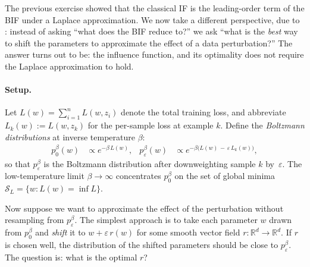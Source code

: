 \documentclass[11pt]{article}
\newcommand{\R}{\mathbb{R}}
\begin{document}
The previous exercise showed that the classical IF is the leading-order term of the BIF under a Laplace approximation. We now take a different perspective, due to \citet{mlodozeniec2025distributional}: instead of asking ``what does the BIF reduce to?'' we ask ``what is the \emph{best} way to shift the parameters to approximate the effect of a data perturbation?'' The answer turns out to be: the influence function, and its optimality does not require the Laplace approximation to hold.

\paragraph{Setup.} Let $L(w) = \sum_{i=1}^n L(w,z_i)$ denote the total training loss, and abbreviate $L_k(w) := L(w,z_k)$ for the per-sample loss at example $k$. Define the \emph{Boltzmann distributions} at inverse temperature $\beta$:
\begin{align*}
  p_0^\beta(w) &\propto e^{-\beta\,L(w)}, &
  p_\varepsilon^\beta(w) &\propto e^{-\beta\bigl(L(w)\,-\,\varepsilon\,L_k(w)\bigr)},
\end{align*}
so that $p_\varepsilon^\beta$ is the Boltzmann distribution after downweighting sample $k$ by~$\varepsilon$. The low-temperature limit $\beta\to\infty$ concentrates $p_0^\beta$ on the set of global minima $\mathcal{S}_L = \{w : L(w) = \inf L\}$.

Now suppose we want to approximate the effect of the perturbation without resampling from $p_\varepsilon^\beta$. The simplest approach is to take each parameter $w$ drawn from $p_0^\beta$ and \emph{shift} it to $w + \varepsilon\,r(w)$ for some smooth vector field $r:\R^d\to\R^d$. If $r$ is chosen well, the distribution of the shifted parameters should be close to $p_\varepsilon^\beta$. The question is: what is the optimal $r$?
\end{document}
